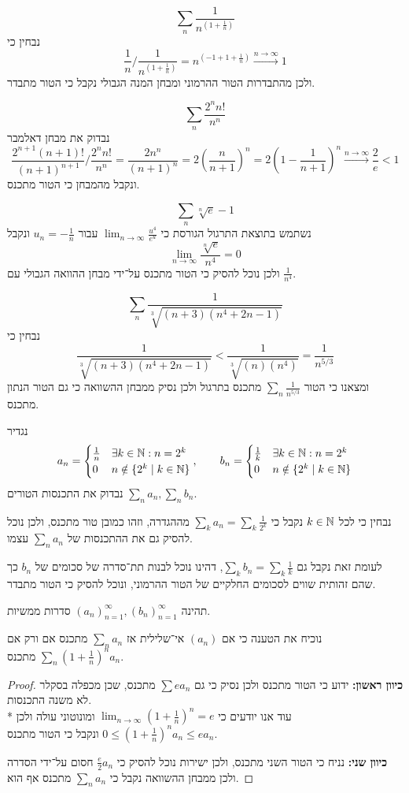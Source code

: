 \Subquestion{}
\[
	\sum_n \frac{1}{n^{(1 + \frac{1}{n})}}
\]
נבחין כי
\[
	\frac{1}{n} / \frac{1}{n^{(1 + \frac{1}{n})}}
	= n^{(-1 + 1 + \frac{1}{n})}
	\xrightarrow{n \to \infty} 1
\]
ולכן מהתבדרות הטור ההרמוני ומבחן המנה הגבולי נקבל כי הטור מתבדר.

\Subquestion{}
\[
	\sum_n \frac{2^n n!}{n^n}
\]
נבדוק את מבחן דאלמבר
\[
	\frac{2^{n + 1} (n + 1)!}{{(n + 1)}^{n + 1}} / \frac{2^n n!}{n^n}
	= \frac{2 n^n}{{(n + 1)}^n}
	= 2 {(\frac{n}{n + 1})}^n
	= 2 {(1 - \frac{1}{n + 1})}^n
	\xrightarrow{n \to \infty} \frac{2}{e} < 1
\]
ונקבל מהמבחן כי הטור מתכנס.

\Subquestion{}
\[
	\sum_n \sqrt[n]{e} - 1
\]
נשתמש בתוצאת התרגול הגורסת כי $\lim_{n \to \infty} \frac{u^4}{e^u}$ עבור $u_n = -\frac{1}{n}$ ונקבל
\[
	\lim_{n \to \infty} \frac{\sqrt[n]{e}}{n^4} = 0
\]
ולכן נוכל להסיק כי הטור מתכנס על־ידי מבחן ההוואה הגבולי עם $\frac{1}{n^4}$.

\Subquestion{}
\[
	\sum_n \frac{1}{\sqrt[3]{(n + 3)(n^4 + 2n - 1)}}
\]
נבחין כי
\[
	\frac{1}{\sqrt[3]{(n + 3)(n^4 + 2n - 1)}} < \frac{1}{\sqrt[3]{(n)(n^4)}} = \frac{1}{n^{5/3}}
\]
ומצאנו כי הטור $\sum_n \frac{1}{n^{5/3}}$ מתכנס בתרגול ולכן נסיק ממבחן ההשוואה כי גם הטור הנתון מתכנס.

\Question{}
נגדיר
\[
	a_n = \begin{cases}
		\frac{1}{n} & \exists k \in \mathbb{N} : n = 2^k \\
		0 & n \notin \{ 2^k \mid k \in \mathbb{N} \}
	\end{cases},
	\qquad
	b_n = \begin{cases}
		\frac{1}{k} & \exists k \in \mathbb{N} : n = 2^k \\
		0 & n \notin \{ 2^k \mid k \in \mathbb{N} \}
	\end{cases}
\]
נבדוק את התכנסות הטורים $\sum_n a_n, \sum_n b_n$.

נבחין כי לכל $k \in \mathbb{N}$ נקבל כי $\sum_k a_n = \sum_k \frac{1}{2^k}$ מההגדרה, וזהו כמובן טור מתכנס, ולכן נוכל להסיק גם את ההתכנסות של $\sum_n a_n$ עצמו.

לעומת זאת נקבל גם $\sum_k b_n = \sum_k \frac{1}{k}$, דהינו נוכל לבנות תת־סדרה של סכומים של $b_n$ כך שהם זהותית שווים לסכומים החלקיים של הטור ההרמוני, ונוכל להסיק כי הטור מתבדר.

\Question{}
תהינה ${(a_n)}_{n = 1}^\infty, {(b_n)}_{n = 1}^\infty$ סדרות ממשיות.

\Subquestion{}
נוכיח את הטענה כי אם $(a_n)$ אי־שלילית אז $\sum_n a_n$ מתכנס אם ורק אם $\sum_n {(1 + \frac{1}{n})}^n a_n$ מתכנס.
\begin{proof}
	\textbf{כיוון ראשון:}
	ידוע כי הטור מתכנס ולכן נסיק כי גם $\sum e a_n$ מתכנס, שכן מכפלה בסקלר לא משנה התכנסות. \\*
	עוד אנו יודעים כי $\lim_{n \to \infty} {(1 + \frac{1}{n})}^n = e$ ומונוטוני עולה ולכן $0 \le {(1 + \frac{1}{n})}^n a_n \le e a_n$ ונקבל כי הטור מתכנס.

	\textbf{כיוון שני:}
	נניח כי הטור השני מתכנס, ולכן ישירות נוכל להסיק כי $\frac{e}{2} a_n$ חסום על־ידי הסדרה ולכן ממבחן ההשוואה נקבל כי $\sum_n a_n$ מתכנס אף הוא.
\end{proof}

